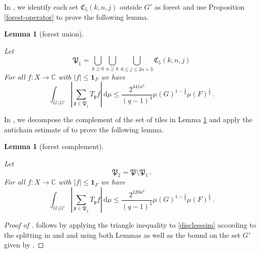 \documentclass[10pt,a4paper]{article}
\theoremstyle{plain}
\newtheorem{lemma}[theorem]{Lemma}
\theoremstyle{definition}
\numberwithin{equation}{subsection}
\newcommand{\fp}{{\mathfrak p}}
\newcommand{\fP}{{\mathfrak P}}
\newcommand{\fC}{{\mathfrak C}}
\newcommand{\lean}[1]{}
\newcommand{\proves}[1]{}
\newcommand{\uses}[1]{}
\newcommand{\leanok}{}
\def\C{\mathbb{C}}
\begin{document}
In , we identify each set $\fC_5(k,n,j)$ outside $G'$ as forest and use Proposition
\ref{forest-operator} to prove the following lemma.

\begin{lemma}[forest union]
    \label{forest-union}
    \leanok
    \lean{forest_union}
    \uses{forest-operator,C-dens1,C6-forest, forest-geometry, forest-convex,forest-separation, forest-inner,forest-stacking}
    Let
    \begin{equation}
        \fP_1 =\bigcup_{k\ge 0}\bigcup_{n\ge k}
        \bigcup_{0\le j\le 2n+3}\fC_5(k,n,j)
    \end{equation}
    For all $f:X\to \C$ with $|f|\le \mathbf{1}_F$ we have
    \begin{equation}
        \label{disclesssim1}
        \int_{G \setminus G'} \left|\sum_{\fp \in \fP_1} T_{\fp} f \right|\, \mathrm{d}\mu \le \frac{2^{441a^3}}{(q-1)^4} \mu(G)^{1 - \frac{1}{q}} \mu(F)^{\frac{1}{q}}\,.
    \end{equation}
\end{lemma}

In , we decompose
the complement of the set of tiles in Lemma
\ref{forest-union} and apply the antichain estimate of
 to prove the following lemma.

\begin{lemma}[forest complement]
    \label{forest-complement}
    \leanok
    \lean{forest_complement}
    \uses{antichain-operator,antichain-decomposition,L0-antichain,L2-antichain,L1-L3-antichain,C-dens1}
    Let
    \begin{equation}
        \fP_2 =\fP\setminus \fP_1\,.
    \end{equation}
    For all $f:X\to \C$ with $|f|\le \mathbf{1}_F$ we have
    \begin{equation}
        \label{disclesssim2}
        \int_{G \setminus G'} \left|\sum_{\fp \in \fP_2} T_{\fp} f\right| \, \mathrm{d}\mu \le \frac{2^{120a^3}}{(q-1)^5} \mu(G)^{1 - \frac{1}{q}} \mu(F)^{\frac{1}{q}}\,.
    \end{equation}
\end{lemma}

\begin{proof}[Proof of ]
\leanok
\proves{discrete-Carleson}
 follows by applying the
triangle inequality to \eqref{disclesssim}
according to the splitting in 
and  and using both Lemmas as well
as the bound on the set $G'$ given by .
\end{proof}
\end{document}

